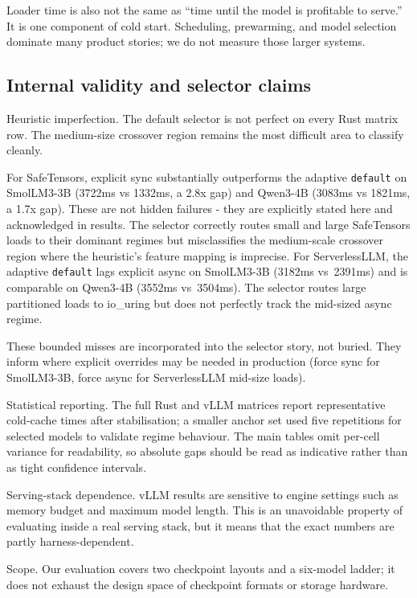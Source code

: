 Loader time is also not the same as ``time until the model is profitable to serve.'' It is one component of cold start. Scheduling, prewarming, and model selection dominate many product stories; we do not measure those larger systems.

\subsection{Internal validity and selector claims}

Heuristic imperfection. The default selector is not perfect on every Rust matrix row. The medium-size crossover region remains the most difficult area to classify cleanly.

For SafeTensors, explicit sync substantially outperforms the adaptive \texttt{default} on SmolLM3-3B (3722ms vs 1332ms, a 2.8x gap) and Qwen3-4B (3083ms vs 1821ms, a 1.7x gap). These are not hidden failures - they are explicitly stated here and acknowledged in results.
The selector correctly routes small and large SafeTensors loads to their dominant regimes but misclassifies the medium-scale crossover region where the heuristic's feature mapping is imprecise. For ServerlessLLM, the adaptive \texttt{default} lags explicit async on SmolLM3-3B (3182ms vs~2391ms) and is comparable on Qwen3-4B (3552ms vs~3504ms). The selector routes large partitioned loads to io\_uring but does not perfectly track the mid-sized async regime.

These bounded misses are incorporated into the selector story, not buried. They inform where explicit overrides may be needed in production (force sync for SmolLM3-3B, force async for ServerlessLLM mid-size loads).

Statistical reporting. The full Rust and vLLM matrices report representative cold-cache times after stabilisation; a smaller anchor set used five repetitions for selected models to validate regime behaviour. The main tables omit per-cell variance for readability, so absolute gaps should be read as indicative rather than as tight confidence intervals.

Serving-stack dependence. vLLM results are sensitive to engine settings such as memory budget and maximum model length. This is an unavoidable property of evaluating inside a real serving stack, but it means that the exact numbers are partly harness-dependent.

Scope. Our evaluation covers two checkpoint layouts and a six-model ladder; it does not exhaust the design space of checkpoint formats or storage hardware.

